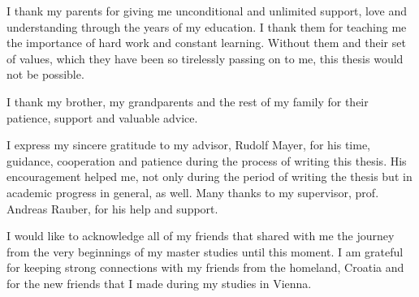 \begin{acknowledgements*}
I thank my parents for giving me unconditional and unlimited support, love and understanding through the years of my education. I thank them for teaching me the importance of hard work and constant learning. Without them and their set of values, which they have been so tirelessly passing on to me, this thesis would not be possible.

I thank my brother, my grandparents and the rest of my family for their patience, support and valuable advice. 

I express my sincere gratitude to my advisor, Rudolf Mayer, for his time, guidance, cooperation and patience during the process of writing this thesis. His encouragement helped me, not only during the period of writing the thesis but in academic progress in general, as well. Many thanks to my supervisor, prof. Andreas Rauber, for his help and support.

I would like to acknowledge all of my friends that shared with me the journey from the very beginnings of my master studies until this moment. I am grateful for keeping strong connections with my friends from the homeland, Croatia and for the new friends that I made during my studies in Vienna.
\end{acknowledgements*}